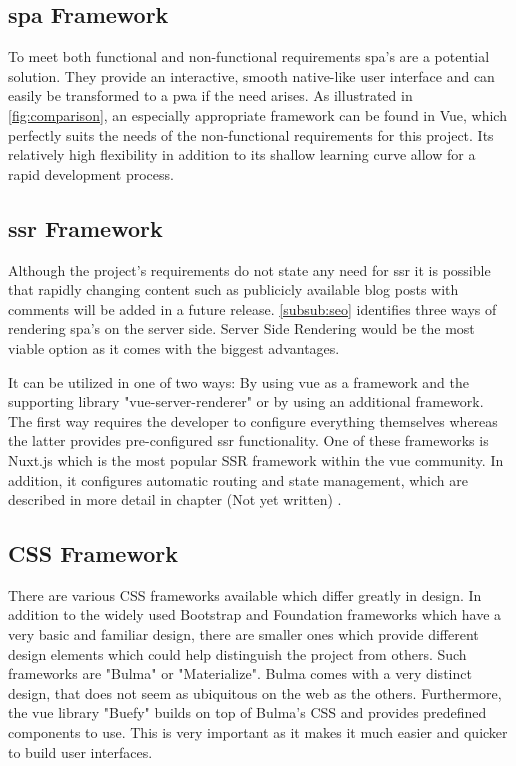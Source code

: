 \subsection{\acrshort{spa} Framework}
To meet both functional and non-functional requirements \acrshort{spa}'s are a potential solution. They provide an interactive, smooth native-like user interface and can easily be transformed to a \acrfull{pwa} if the need arises. As illustrated in \autoref{fig:comparison}, an especially appropriate framework can be found in Vue, which perfectly suits the needs of the non-functional requirements for this project. Its relatively high flexibility in addition to its shallow learning curve allow for a rapid development process.

\subsection{\acrshort{ssr} Framework}
Although the project's requirements do not state any need for \acrshort{ssr} it is possible that rapidly changing content such as publicicly available blog posts with comments will be added in a future release. \autoref{subsub:seo} identifies three ways of rendering \acrshort{spa}'s on the server side. Server Side Rendering would be the most viable option as it comes with the biggest advantages. 

It can be utilized in one of two ways: By using vue as a framework and the supporting library "vue-server-renderer" or by using an additional framework. The first way requires the developer to configure everything themselves whereas the latter provides pre-configured \acrshort{ssr} functionality. One of these frameworks is Nuxt.js which is the most  popular SSR framework within the vue community. In addition, it configures automatic routing and state management, which are described in more detail in chapter (Not yet written) . 

\subsection{CSS Framework}
There are various CSS frameworks available which differ greatly in design. In addition to the widely used Bootstrap and Foundation frameworks which have a very basic and familiar design, there are smaller ones which provide different design elements which could help distinguish the project from others. Such frameworks are "Bulma" or "Materialize". Bulma comes with a very distinct design, that does not seem as ubiquitous on the web as the others. Furthermore, the vue library "Buefy" builds on top of Bulma's CSS and provides predefined components to use. This is very important as it makes it much easier and quicker to build user interfaces.

